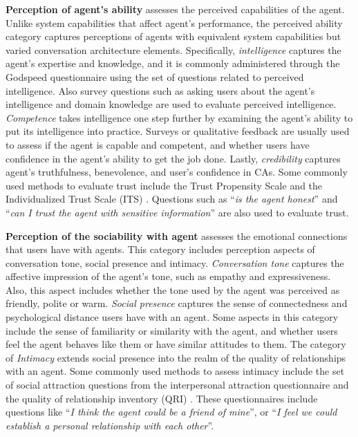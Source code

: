 \textbf{Perception of agent's ability} assesses the perceived capabilities of the agent. Unlike system capabilities that affect agent's performance, the perceived ability category captures perceptions of agents with equivalent system capabilities but varied conversation architecture elements. Specifically, \textit{intelligence} captures the agent's expertise and knowledge, and it is commonly administered through the Godspeed questionnaire \cite{bartneck2009measurement} using the set of questions related to perceived intelligence. Also survey questions such as asking users about the agent's intelligence and domain knowledge are used to evaluate perceived intelligence. \textit{Competence} takes intelligence one step further by examining the agent's ability to put its intelligence into practice. Surveys or qualitative feedback are usually used to assess if the agent is capable and competent, and whether users have confidence in the agent's ability to get the job done. Lastly, \textit{credibility} captures agent's truthfulness, benevolence, and user's confidence in CAs. Some commonly used methods to evaluate trust include the Trust Propensity Scale \cite{mayer1999effect} and the Individualized Trust Scale (ITS) \cite{wheeless1977measurement}. Questions such as ``\textit{is the agent honest}'' and ``\textit{can I trust the agent with sensitive information}'' are also used to evaluate trust.

\textbf{Perception of the sociability with agent} assesses the emotional connections that users have with agents. This category includes perception aspects of conversation tone, social presence and intimacy. \textit{Conversation tone} captures the affective impression of the agent's tone, such as empathy and expressiveness. Also, this aspect includes whether the tone used by the agent was perceived as friendly, polite or warm. \textit{Social presence} captures the sense of connectedness and psychological distance users have with an agent. Some aspects in this category include the sense of familiarity or similarity with the agent, and whether users feel the agent behaves like them or have similar attitudes to them. The category of \textit{Intimacy} extends social presence into the realm of the quality of relationships with an agent. Some commonly used methods to assess intimacy include the set of social attraction questions from the interpersonal attraction questionnaire \cite{mccroskey1975development} and the quality of relationship inventory (QRI) \cite{pierce1997assessing}. These questionnaires include questions like ``\textit{I think the agent could be a friend of mine}'', or ``\textit{I feel we could establish a personal relationship with each other}''.

